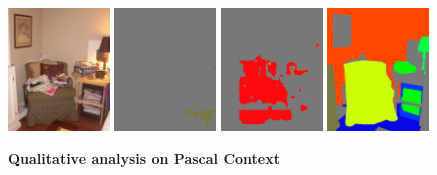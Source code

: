 \begin{figure}[tbh!]
  {\includegraphics[width=0.24\textwidth]{figures/experiments/context/image/0029.jpg}}
  {\includegraphics[width=0.24\textwidth]{figures/experiments/context/orgckpt/0029.png}}
  {\includegraphics[width=0.24\textwidth]{figures/experiments/context/nonnoisy/0029.png}}
  {\includegraphics[width=0.24\textwidth]{figures/experiments/context/gt/2008_000107.png}}


  \caption[\textbf{Qualitative analysis on Pascal Context}]{\textbf{Qualitative analysis on Pascal Context}}
  \label{fig:qualcon}
\end{figure}